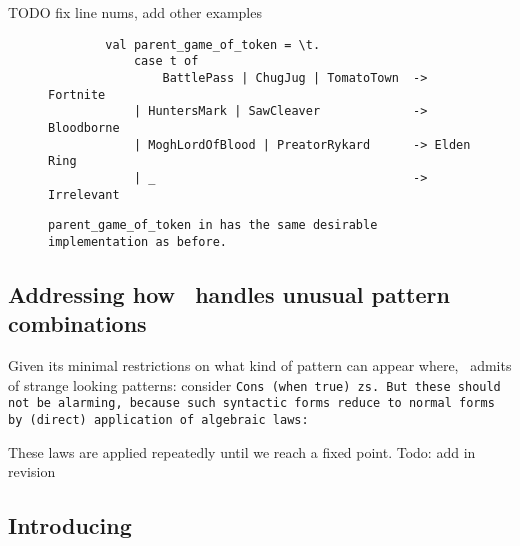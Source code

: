 \documentclass[manuscript,screen,review, 12pt]{acmart}
\begin{document}
    TODO fix line nums, add other examples 
    \begin{figure}
        \begin{center}
            \pplst 
            \begin{lstlisting}
        val parent_game_of_token = \t. 
            case t of  
                BattlePass | ChugJug | TomatoTown  -> Fortnite
            | HuntersMark | SawCleaver             -> Bloodborne
            | MoghLordOfBlood | PreatorRykard      -> Elden Ring
            | _                                    -> Irrelevant
        \end{lstlisting}
        \end{center}    
        \caption{\tt{parent\_game\_of\_token} in \PPlus has the same desirable
        implementation as before.} 
        \label{fig:ppexs}
        \end{figure}
    
    
\subsection{Addressing how \PPlus\ handles unusual pattern combinations}




    Given its minimal restrictions on what kind of pattern can appear where,
    \PPlus\ admits of strange looking patterns: consider \tt{Cons (when true)
    zs}. But these should not be alarming, because such syntactic forms reduce
    to normal forms by (direct) application of algebraic laws: 

    
        
        

        
        
        
        
        
        
        

        
        These laws are applied repeatedly until we reach a fixed point. 
        Todo: add in revision 
\subsection{Introducing \VMinus\ }
\end{document}
